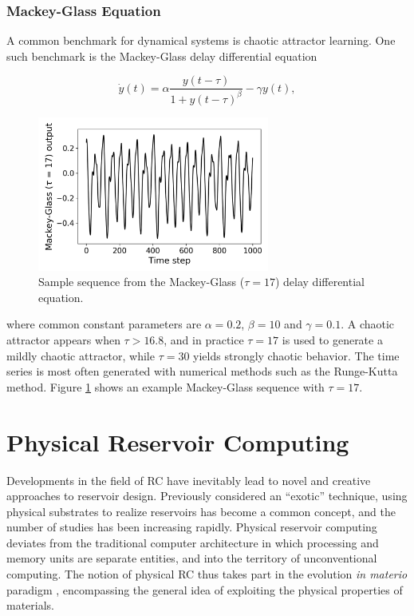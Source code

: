 \subsubsection{Mackey-Glass Equation}

A common benchmark for dynamical systems is chaotic attractor learning. One such
benchmark is the Mackey-Glass delay differential equation

\begin{equation}
  \dot{y}(t) =
    \alpha \frac
    {y(t-\tau)}
    {1 + y(t-\tau)^\beta}
    - \gamma y(t),
  \label{eq:mg17}
\end{equation}

\begin{figure}[t!]
  \centering
  \includegraphics[width=3.0in]{figures/mg17-example.png}
  \caption{
    Sample sequence from the Mackey-Glass ($\tau = 17$) delay differential
equation.
  }
  \label{fig:mg17-example}
\end{figure}

where common constant parameters are $\alpha = 0.2$, $\beta = 10$ and $\gamma =
0.1$. A chaotic attractor appears when $\tau > 16.8$, and in practice $\tau =
17$ is used to generate a mildly chaotic attractor, while $\tau = 30$ yields
strongly chaotic behavior. The time series is most often generated with
numerical methods such as the Runge-Kutta method. Figure \ref{fig:mg17-example}
shows an example Mackey-Glass sequence with $\tau = 17$.

\section{Physical Reservoir Computing}
\label{sec:prc}

Developments in the field of RC have inevitably lead to novel and creative
approaches to reservoir design. Previously considered an ``exotic'' technique,
using physical substrates to realize reservoirs has become a common concept, and
the number of studies has been increasing rapidly. Physical reservoir computing
deviates from the traditional computer architecture in which processing and
memory units are separate entities, and into the territory of unconventional
computing. The notion of physical RC thus takes part in the evolution \textit{in
materio} paradigm \cite{miller_evolution_2002}, encompassing the general idea of
exploiting the physical properties of materials.

